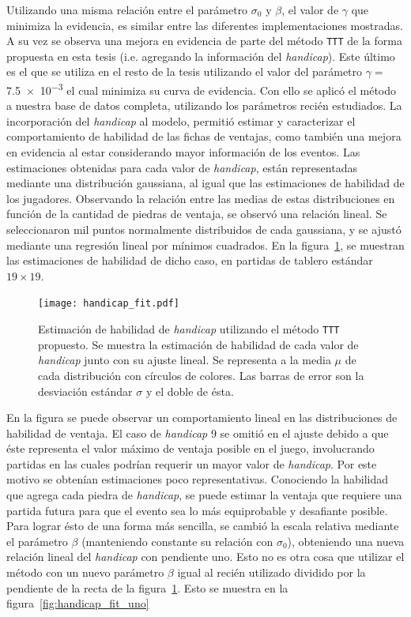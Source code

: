 \documentclass[11pt,twoside, spanish]{report} %
\begin{document}
Utilizando una misma relaci\'on entre el par\'ametro $\sigma_0$ y $\beta$, el valor de $\gamma$ que minimiza la evidencia, es similar entre las diferentes implementaciones mostradas.
A su vez se observa una mejora en evidencia de parte del m\'etodo \texttt{TTT} de la forma propuesta en esta tesis (i.e. agregando la informaci\'on del \textit{handicap}).
Este \'ultimo es el que se utiliza en el resto de la tesis utilizando el valor del par\'ametro $\gamma= $\num{7.5e-3}  el cual minimiza su curva de evidencia.
Con ello se aplic\'o el m\'etodo a nuestra base de datos completa,  utilizando los par\'ametros reci\'en estudiados. 
La incorporaci\'on del \textit{handicap} al modelo, permiti\'o estimar y caracterizar el comportamiento de habilidad de las fichas de ventajas, como tambi\'en una mejora en evidencia al estar considerando mayor informaci\'on de los eventos.
Las estimaciones obtenidas para cada valor de \textit{handicap}, est\'an representadas mediante una distribuci\'on gaussiana, al igual que las estimaciones de habilidad de los jugadores.
Observando la relaci\'on entre las medias de estas distribuciones en funci\'on de la cantidad de piedras de ventaja, se observ\'o una relaci\'on lineal.
Se seleccionaron mil puntos normalmente distribuidos de cada gaussiana, y se ajust\'o mediante una regresi\'on lineal por m\'inimos cuadrados.
En la figura~\ref{fig:handicapFIT}, se muestran las estimaciones de habilidad de dicho caso, en partidas de tablero est\'andar $19\times 19$.


\begin{figure}[H]
	\centering
	\texttt{[image: handicap\_fit.pdf]}
	\caption{Estimaci\'on de habilidad de \textit{handicap} utilizando el m\'etodo \texttt{TTT} propuesto. Se muestra la estimaci\'on de habilidad de cada valor de \textit{handicap} junto con su ajuste lineal. Se representa a la media $\mu$ de cada distribuci\'on con c\'irculos de colores.  Las barras de error son la desviaci\'on est\'andar $\sigma$ y el doble de \'esta. }
	\label{fig:handicapFIT}
\end{figure}


En la figura se puede observar un comportamiento lineal en las distribuciones de habilidad de ventaja.
El caso de \textit{handicap} 9 se omiti\'o en el ajuste debido a que \'este representa el valor m\'aximo de ventaja posible en el juego, involucrando partidas en las cuales podr\'ian requerir un mayor valor de \textit{handicap}.
Por este motivo se obten\'ian estimaciones poco representativas.
Conociendo la habilidad que agrega cada piedra de \textit{handicap}, se puede estimar la ventaja que requiere una partida futura para que el evento sea lo m\'as equiprobable y desafiante posible.
Para lograr \'esto de una forma m\'as sencilla, se cambi\'o la escala relativa mediante el par\'ametro $\beta$ (manteniendo constante su relaci\'on con $\sigma_0$), obteniendo una nueva relaci\'on lineal del \textit{handicap} con pendiente uno.
Esto no es otra cosa que utilizar el m\'etodo con un nuevo par\'ametro $\beta$ igual al reci\'en utilizado dividido por la pendiente de la recta de la figura~\ref{fig:handicapFIT}.
Esto se muestra en la figura~\ref{fig:handicap_fit_uno}
\end{document}
